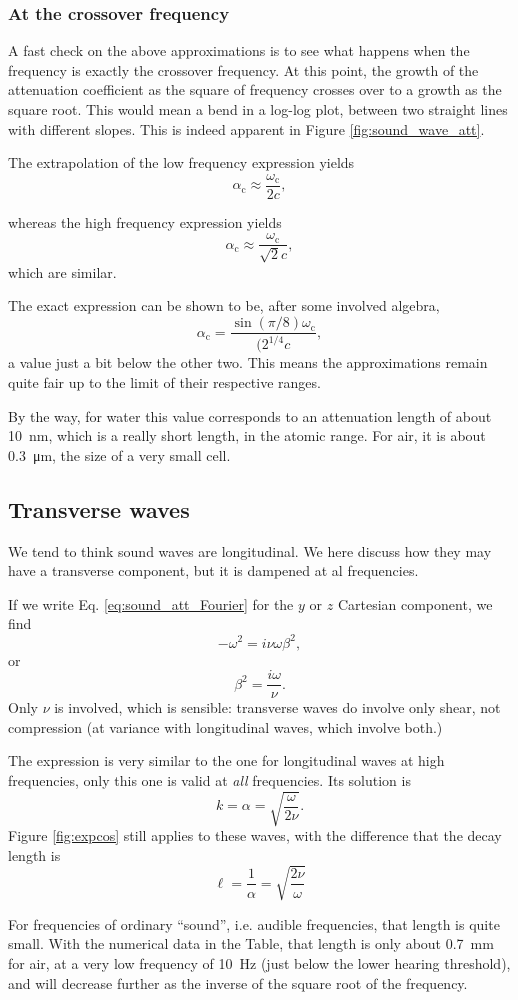 \subsubsection{At the crossover frequency}

A fast check on the above approximations is to see what happens when
the frequency is exactly the crossover frequency. At this point, the
growth of the attenuation coefficient as the square of frequency
crosses over to a growth as the square root. This would mean a bend in
a log-log plot, between two straight lines with different slopes. This
is indeed apparent in Figure \ref{fig:sound_wave_att}.

The extrapolation of the low frequency expression yields
\[
\alpha_\mathrm{c}\approx \frac{\omega_\mathrm{c}}{2 c} ,
\]

whereas the high frequency expression yields
\[
\alpha_\mathrm{c}\approx \frac{\omega_\mathrm{c}}{\sqrt{2} c} ,
\]
which are similar.

The exact expression can be shown to be, after some involved algebra,
\[
\alpha_\mathrm{c} =\frac{ \sin(\pi/8) \omega_\mathrm{c} }{ (2^{1/4} c } ,
\]
a value just a bit below the other two. This means the approximations
remain quite fair up to the limit of their respective ranges.

By the way, for water this value corresponds to an attenuation length
of about \SI{10}{\nano\meter}, which is a really short length, in the
atomic range. For air, it is about \SI{0.3}{\micro\meter}, the size of
a very small cell.

\subsection{Transverse waves}

We tend to think sound waves are longitudinal. We here discuss how
they may have a transverse component, but it is dampened at al
frequencies.

If we write Eq. \ref{eq:sound_att_Fourier} for the $y$ or $z$
Cartesian component, we find
\[
-\omega^2 =  i \nu \omega \beta^2 ,
\]
or
\[
\beta^2 = \frac{i \omega}{\nu}.
\]
Only $\nu$ is involved, which is sensible: transverse waves do involve
only shear, not compression (at variance with longitudinal waves,
which involve both.)

The expression is very similar to the one for longitudinal waves at
high frequencies, only this one is valid at \emph{all} frequencies.
Its solution is
\[
k = \alpha = \sqrt{ \frac{\omega}{ 2 \nu}}.
\]
Figure \ref{fig:expcos} still applies to these waves, with the
difference that the decay length is
\[
\ell= \frac{1}{\alpha}=\sqrt{\frac{ 2 \nu}{\omega}}
\]

For frequencies of ordinary ``sound'', i.e. audible frequencies, that
length is quite small. With the numerical data in the Table, that
length is only about \SI{0.7}{\milli\meter} for air, at a very low
frequency of \SI{10}{\hertz} (just below the lower hearing threshold),
and will decrease further as the inverse of the square root of the
frequency.

